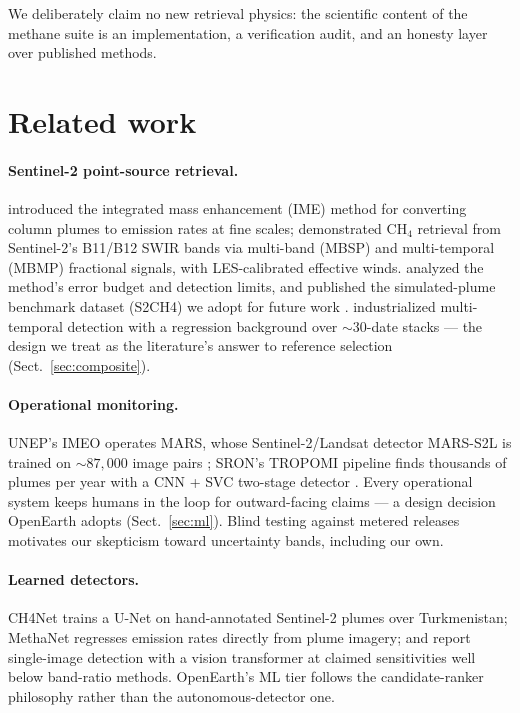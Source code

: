\documentclass[11pt]{article}
\begin{document}
We deliberately claim no new retrieval physics: the scientific content of
the methane suite is an implementation, a verification audit, and an
honesty layer over published methods.

\section{Related work}\label{sec:related}

\paragraph{Sentinel-2 point-source retrieval.}
\citet{varon2018} introduced the integrated mass enhancement (IME) method
for converting column plumes to emission rates at fine scales;
\citet{varon2021} demonstrated CH$_4$ retrieval from Sentinel-2's B11/B12
SWIR bands via multi-band (MBSP) and multi-temporal (MBMP) fractional
signals, with LES-calibrated effective winds. \citet{gorrono2023} analyzed
the method's error budget and detection limits, and published the
simulated-plume benchmark dataset (S2CH4) we adopt for future work
\citep{s2ch4_dataset}. \citet{ehret2022} industrialized multi-temporal
detection with a regression background over ${\sim}30$-date stacks ---
the design we treat as the literature's answer to reference selection
(Sect.~\ref{sec:composite}).

\paragraph{Operational monitoring.}
UNEP's IMEO operates MARS, whose Sentinel-2/Landsat detector MARS-S2L is
trained on ${\sim}87{,}000$ image pairs \citep{allen2025mars,
mars_s2l_dataset}; SRON's TROPOMI pipeline finds thousands of plumes per
year with a CNN + SVC two-stage detector \citep{schuit2023}. Every
operational system keeps humans in the loop for outward-facing claims ---
a design decision OpenEarth adopts (Sect.~\ref{sec:ml}). Blind testing
against metered releases \citep{sherwin2024} motivates our skepticism
toward uncertainty bands, including our own.

\paragraph{Learned detectors.}
CH4Net \citep{vaughan2024} trains a U-Net on hand-annotated Sentinel-2
plumes over Turkmenistan; MethaNet \citep{jongaramrungruang2022}
regresses emission rates directly from plume imagery; and
\citet{rouetleduc2024} report single-image detection with a vision
transformer at claimed sensitivities well below band-ratio methods.
OpenEarth's ML tier follows the candidate-ranker philosophy rather than
the autonomous-detector one.
\end{document}
